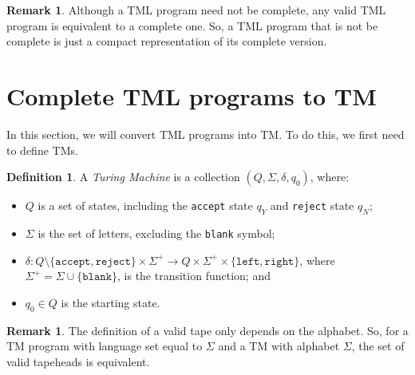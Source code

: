 \documentclass{amsart}
\theoremstyle{definition}
\newtheorem{definition}[theorem]{Definition}
\newtheorem{remark}[theorem]{Remark}
\begin{document}
    \begin{remark}
        Although a TML program need not be complete, any valid TML program is equivalent to a complete one. So, a TML program that is not be complete is just a compact representation of its complete version.
    \end{remark}

    \section{Complete TML programs to TM}
    In this section, we will convert TML programs into TM. To do this, we first need to define TMs.
    \begin{definition}
        A \emph{Turing Machine} is a collection $(Q, \Sigma, \delta, q_0)$, where:
        \begin{itemize}
            \item $Q$ is a set of states, including the \texttt{accept} state $q_Y$ and \texttt{reject} state $q_N$;
            \item $\Sigma$ is the set of letters, excluding the \texttt{blank} symbol;
            \item $\delta: Q \setminus \{\texttt{accept}, \texttt{reject}\} \times \Sigma^+ \to Q \times \Sigma^+ \times \{\texttt{left}, \texttt{right}\}$, where $\Sigma^+ = \Sigma \cup \{\texttt{blank}\}$, is the transition function; and
            \item $q_0 \in Q$ is the starting state.
        \end{itemize}
    \end{definition}


    \begin{remark}
        The definition of a valid tape only depends on the alphabet. So, for a TM program with language set equal to $\Sigma$ and a TM with alphabet $\Sigma$, the set of valid tapeheads is equivalent.
    \end{remark}
    
\end{document}
